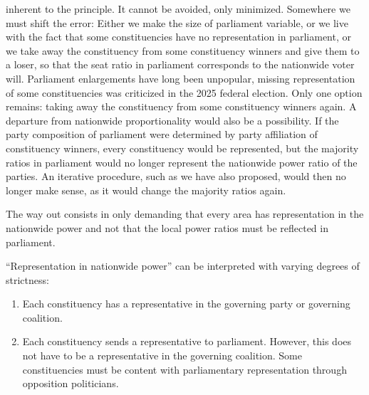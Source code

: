 inherent to the principle. It cannot be avoided, only minimized. Somewhere we must
shift the error: Either we make the size of parliament variable, or we live with the fact that
some constituencies have no representation in parliament, or we take away the constituency from some
constituency winners and give them to a loser, so that the seat ratio in
parliament corresponds to the nationwide voter will. Parliament enlargements have long been
unpopular, missing representation of some constituencies was criticized in the 2025 federal election.
Only one option remains: taking away the constituency from some constituency winners again.
A departure from nationwide proportionality would also be a possibility. If the
party composition of parliament were determined by party affiliation of constituency winners,
every constituency would be represented, but the majority ratios in parliament would
no longer represent the nationwide power ratio of the parties. An iterative
procedure, such as we have also proposed, would then no longer make sense, as it
would change the majority ratios again.

The way out consists in only demanding that every area has representation in the
nationwide power and not that the local power ratios must be
reflected in parliament.



\enquote{Representation in nationwide power} can be interpreted with varying degrees of strictness:
\begin{enumerate}[label=\alph*)]
  \item Each constituency has a representative in the governing party or
    governing coalition.
  \item Each constituency sends a representative to parliament. However, this does not have to be a
    representative in the governing coalition. Some constituencies must be content with
    parliamentary representation through opposition politicians.
\end{enumerate}

